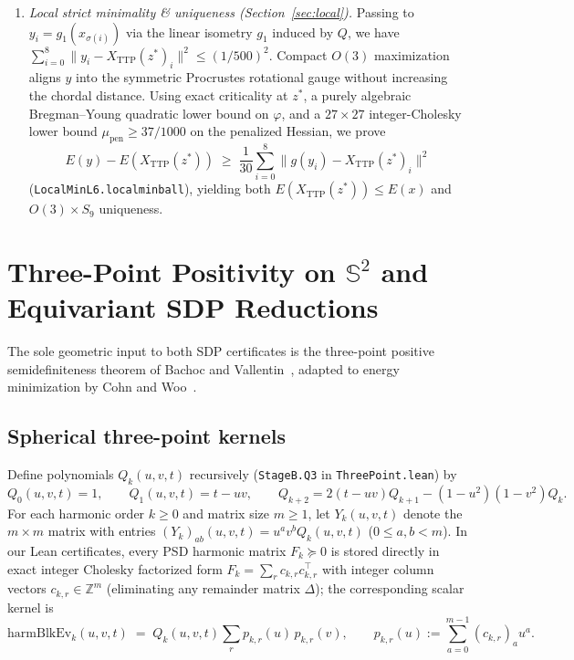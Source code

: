 \documentclass[11pt,reqno]{amsart}
\renewcommand{\_}{\origunderscore\allowbreak}
\theoremstyle{definition}
\newcommand{\Z}{\mathbb{Z}}
\newcommand{\Sph}{\mathbb{S}^2}
\newcommand{\norm}[1]{\lVert #1 \rVert}
\newcommand{\TTP}{X_{\mathrm{TTP}}}
\begin{document}
\begin{enumerate}[leftmargin=2.2em]
\begin{enumerate}[label=\textup{(\alph*)},leftmargin=1.8em]
    \item \emph{Local strict minimality \& uniqueness (Section~\ref{sec:local}).} Passing to $y_i = g_1(x_{\sigma(i)})$ via the linear isometry $g_1$ induced by $Q$, we have $\sum_{i=0}^8 \norm{y_i - \TTP(z^*)_i}^2 \le (1/500)^2$. Compact $O(3)$ maximization aligns $y$ into the symmetric Procrustes rotational gauge without increasing the chordal distance. Using exact criticality at $z^*$, a purely algebraic Bregman--Young quadratic lower bound on $\varphi$, and a $27\times 27$ integer-Cholesky lower bound $\mu_{\mathrm{pen}} \ge 37/1000$ on the penalized Hessian, we prove
    \[
      E(y) - E(\TTP(z^*)) \;\ge\; \frac{1}{30} \sum_{i=0}^8 \norm{g(y_i) - \TTP(z^*)_i}^2
    \]
    (\texttt{LocalMinL6.local\_min\_ball}), yielding both $E(\TTP(z^*)) \le E(x)$ and $O(3)\times S_9$ uniqueness.
  \end{enumerate}
\end{enumerate}

\section{Three-Point Positivity on $\Sph$ and Equivariant SDP Reductions}\label{sec:threepoint}

The sole geometric input to both SDP certificates is the three-point positive semidefiniteness theorem of Bachoc and Vallentin~\cite{BachocVallentin2008}, adapted to energy minimization by Cohn and Woo~\cite{CohnWoo2012}.

\subsection{Spherical three-point kernels}\label{subsec:kernels}
Define polynomials $Q_k(u,v,t)$ recursively (\texttt{StageB.Q3} in \texttt{ThreePoint.lean}) by
\begin{equation}\label{eq:Q3-rec}
  Q_0(u,v,t) = 1, \qquad Q_1(u,v,t) = t - uv, \qquad Q_{k+2} = 2(t-uv)Q_{k+1} - (1-u^2)(1-v^2)Q_k.
\end{equation}
For each harmonic order $k \ge 0$ and matrix size $m \ge 1$, let $Y_k(u,v,t)$ denote the $m \times m$ matrix with entries $(Y_k)_{ab}(u,v,t) = u^a v^b Q_k(u,v,t)$ ($0 \le a, b < m$).
In our Lean certificates, every PSD harmonic matrix $F_k \succeq 0$ is stored directly in exact integer Cholesky factorized form $F_k = \sum_{r} c_{k,r} c_{k,r}^\top$ with integer column vectors $c_{k,r} \in \Z^m$ (eliminating any remainder matrix $\Delta$); the corresponding scalar kernel is
\[
  \mathrm{harmBlkEv}_k(u,v,t) \;=\; Q_k(u,v,t) \sum_r p_{k,r}(u)\, p_{k,r}(v), \qquad p_{k,r}(u) := \sum_{a=0}^{m-1} (c_{k,r})_a u^a.
\]
\end{document}
